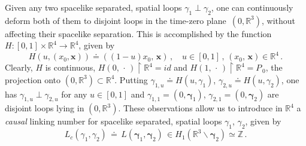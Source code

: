 \documentclass[11pt]{article}
\numberwithin{equation}{section}
\newcommand{\RR}{{\mathbb R}}
\newcommand{\ZZ}{{\mathbb Z}}
\newcommand{\bgamma}{{\bm \gamma}}
\newcommand{\bix}{{\bm x}}
\begin{document}
\medskip 
Given any two spacelike separated,  
spatial loops $\gamma_1 \perp \gamma_2$, one can continuously deform 
both of them to disjoint loops in the 
time-zero plane~$(0,\RR^3)$, without affecting their 
spacelike separation. This is accomplished by the function 
$H: [0,1] \times \RR^4 \rightarrow \RR^4$, given by 
$$
H(u,(x_0,\bix)) \doteq ((1-u)x_0,\,\bix) 
\, , \quad  u \in [0,1] \, , \, 
(x_0,\,\bix) \in \RR^4 \, . 
$$
Clearly, $H$ is continuous, 
$H(0,\, \cdot \,) \upharpoonright \RR^4 
= id$ and 
$H(1,\, \cdot \,) \upharpoonright \RR^4
= P_{\, 0}$, the projection onto $(0,\RR^3) \subset \RR^4$. Putting 
$\gamma_{1,u} \doteq H(u,\gamma_1)$, $\gamma_{2,u} \doteq H(u,\gamma_2)$, 
one has $\gamma_{1,u} \perp \gamma_{2,u}$ for any $u \in [0,1]$ and
$\gamma_{1,1} = (0, \bgamma_1)$, $\gamma_{2,1} = (0, \bgamma_2)$
are disjoint loops lying in $(0, \RR^3)$.  
These observations allow us to introduce 
in $\RR^4$ a \textit{causal} linking number for spacelike separated,
spatial loops $\gamma_1$, $\gamma_2$, given by
%
\begin{equation}
\label{linking}
L_c(\gamma_1,\gamma_2) \, \doteq \, 
L(\bgamma_1, \bgamma_2) \, \in H_1(\RR^3 \backslash \bgamma_2) \simeq \ZZ \, .
\end{equation}
%
\end{document}
